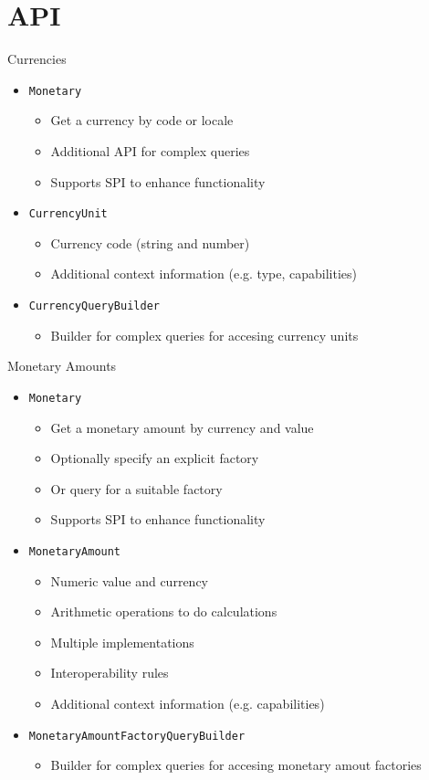 \documentclass{beamer}
\newcommand{\code}[1]{\texttt{#1}}
\newcommand{\slideItems}[1]{
	\begin{itemize}
		#1
	\end{itemize}
}
\newcommand{\slide}[2]{
	\begin{frame}{#1}
		#2
	\end{frame}
}
\begin{document}
\section{API}

\slide{Currencies}{
	\slideItems{
		\item \code{Monetary}
			\slideItems{
				\item Get a currency by code or locale
				\item Additional API for complex queries
				\item Supports SPI to enhance functionality
			}
		\item \code{CurrencyUnit}
			\slideItems{
				\item Currency code (string and number)
				\item Additional context information (e.g. type, capabilities)
			}
		\item \code{CurrencyQueryBuilder}
			\slideItems{
				\item Builder for complex queries for accesing currency units
			}
	}
}

\slide{Monetary Amounts}{
	\slideItems{
		\item \code{Monetary}
			\slideItems{
				\item Get a monetary amount by currency and value
				\item Optionally specify an explicit factory
				\item Or query for a suitable factory
				\item Supports SPI to enhance functionality
			}
		\item \code{MonetaryAmount}
			\slideItems{
				\item Numeric value and currency
				\item Arithmetic operations to do calculations
				\item Multiple implementations
				\item Interoperability rules
				\item Additional context information (e.g. capabilities)
			}
		\item \code{MonetaryAmountFactoryQueryBuilder}
			\slideItems{
				\item Builder for complex queries for accesing monetary amout factories
			}
	}
}
\end{document}
